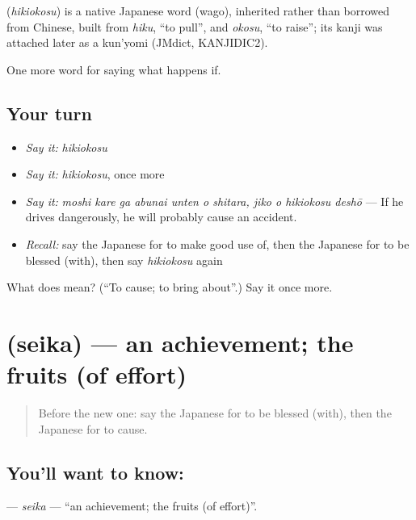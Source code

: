 \begin{cousinweb}
\textbf{} (\emph{hikiokosu}) is a native Japanese word (wago), inherited rather than borrowed from Chinese, built from \emph{hiku}, \textquotedblleft{}to pull\textquotedblright{}, and \emph{okosu}, \textquotedblleft{}to raise\textquotedblright{}; its kanji was attached later as a kun'yomi (JMdict, KANJIDIC2).
\end{cousinweb}

\begin{grammarlens}[title={What you've built}]
One more word for saying what happens if.
\end{grammarlens}

\subsection*{Your turn}
\begin{itemize}
\raggedright
  \item \emph{Say it:} \emph{hikiokosu}
  \item \emph{Say it:} \emph{hikiokosu}, once more
  \item \emph{Say it:} \emph{moshi kare ga abunai unten o shitara, jiko o hikiokosu deshō} — If he drives dangerously, he will probably cause an accident.
  \item \emph{Recall:} say the Japanese for to make good use of, then the Japanese for to be blessed (with), then say \emph{hikiokosu} again
\end{itemize}

\begin{tcolorbox}[breakable,colback=teal!4,colframe=teal!35!black,title={Before you move on}]
What does  mean? (\textquotedblleft{}To cause; to bring about\textquotedblright{}.) Say it once more.
\end{tcolorbox}
\section[\texorpdfstring{\ja{せいか} (seika)}{せいか (seika)}]{ (seika) — an achievement; the fruits (of effort)}

\label{lesson:JA-C511-seika}



\begin{quote}
Before the new one: say the Japanese for to be blessed (with), then the Japanese for to cause.
\end{quote}

\subsection*{You'll want to know: }
\textbf{} — \emph{seika} — \textquotedblleft{}an achievement; the fruits (of effort)\textquotedblright{}.

